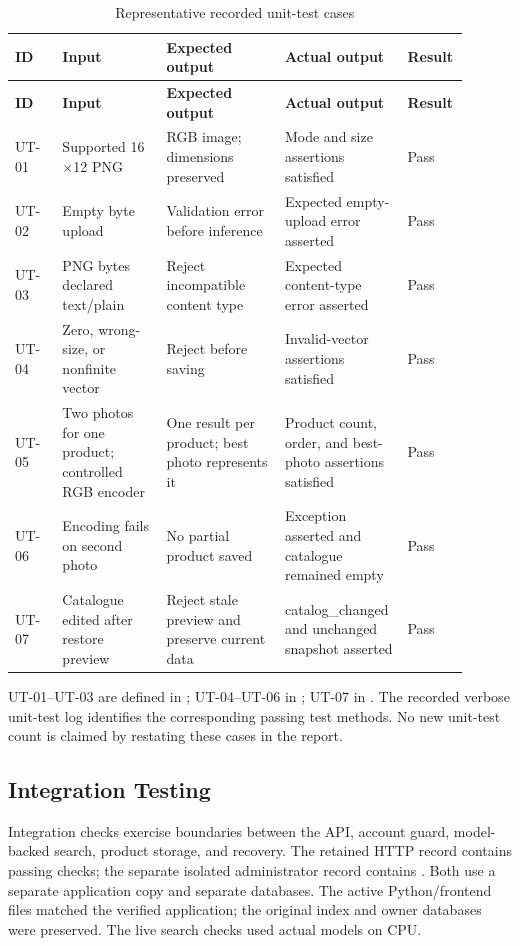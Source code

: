 \begin{ReportTable}\setlength{\tabcolsep}{3pt}
\begin{longtable}{@{}L{0.10\linewidth}L{0.22\linewidth}L{0.25\linewidth}L{0.25\linewidth}L{0.08\linewidth}@{}}
\caption{Representative recorded unit-test cases}\label{tab:unit-cases}\\
\toprule\textbf{ID}&\textbf{Input}&\textbf{Expected output}&\textbf{Actual output}&\textbf{Result}\\\midrule\endfirsthead
\toprule\textbf{ID}&\textbf{Input}&\textbf{Expected output}&\textbf{Actual output}&\textbf{Result}\\\midrule\endhead
UT-01 & Supported 16$\times$12 PNG & RGB image; dimensions preserved & Mode and size assertions satisfied & Pass\\\addlinespace
UT-02 & Empty byte upload & Validation error before inference & Expected empty-upload error asserted & Pass\\\addlinespace
UT-03 & PNG bytes declared text/plain & Reject incompatible content type & Expected content-type error asserted & Pass\\\addlinespace
UT-04 & Zero, wrong-size, or nonfinite vector & Reject before saving & Invalid-vector assertions satisfied & Pass\\\addlinespace
UT-05 & Two photos for one product; controlled RGB encoder & One result per product; best photo represents it & Product count, order, and best-photo assertions satisfied & Pass\\\addlinespace
UT-06 & Encoding fails on second photo & No partial product saved & Exception asserted and catalogue remained empty & Pass\\\addlinespace
UT-07 & Catalogue edited after restore preview & Reject stale preview and preserve current data & catalog\_changed and unchanged snapshot asserted & Pass\\
\bottomrule
\end{longtable}
\end{ReportTable}

UT-01--UT-03 are defined in ;
UT-04--UT-06 in ; UT-07 in
. The recorded verbose unit-test log identifies
the corresponding passing test methods. No new unit-test count is claimed by
restating these cases in the report.

\subsection{Integration Testing}
Integration checks exercise boundaries between the API, account
guard, model-backed search, product storage, and recovery. The retained HTTP
record contains \HTTPTestCount{} passing checks; the separate isolated
administrator record contains \AdministrationTestCount{}. Both use a separate
application copy and separate databases. The active Python/frontend files
matched the verified application; the original index and owner databases were
preserved. The live search checks used actual models on CPU.

